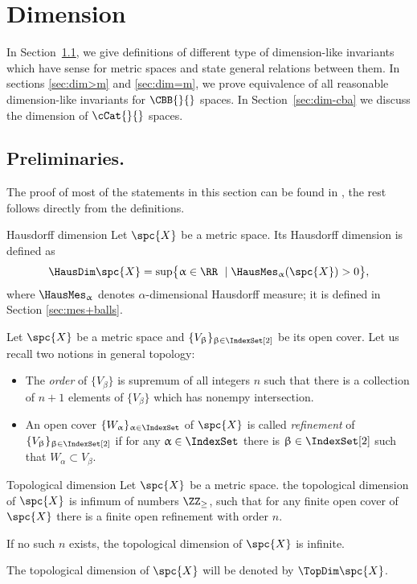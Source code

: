 \chapter{Dimension %
}

In Section~\ref{sec:prelim:dim}, we give definitions of different type of dimension-like invariants which have sense for metric spaces and state general relations between them.
In sections \ref{sec:dim>m} and \ref{sec:dim=m},
we prove equivalence of all reasonable dimension-like invariants for $\CBB{}{}$ spaces.
In Section~\ref{sec:dim-cba} we discuss the dimension of  $\cCat{}{}$ spaces.

\section{Preliminaries.}\label{sec:prelim:dim}

The proof of most of the statements in this section can be found in \cite{top-dim}, 
the rest follows directly from the definitions.

\begin{thm}{Hausdorff dimension}
\label{def:HausDim}
Let $\spc{X}$ be a metric space. 
Its Hausdorff dimension is defined as
\[\HausDim\spc{X}=\sup\bigl\{\alpha\in\RR\ \mid \HausMes_\alpha(\spc{X})>0\bigr\},\]
 where $\HausMes_\alpha$ denotes $\alpha$-dimensional Hausdorff measure;
it is defined in Section \ref{sec:mes+balls}.
\end{thm}

Let $\spc{X}$ be a metric space and $\{V_\beta\}_{\beta\in\IndexSet[2]}$
 be its open cover.
Let us recall two notions in general topology:
\begin{itemize}
\item The \emph{order} of $\{V_\beta\}$ is supremum of all integers $n$ such that there is a collection of $n+1$ elements of $\{V_\beta\}$ which has nonempy intersection.
\item An open cover $\{W_\alpha\}_{\alpha\in\IndexSet}$ of $\spc{X}$ is called \emph{refinement} of  $\{V_\beta\}_{\beta\in\IndexSet[2]}$ if for any $\alpha\in\IndexSet$ there is $\beta\in\IndexSet[2]$ such that $W_\alpha\subset V_\beta$.
\end{itemize}

\begin{thm}{Topological dimension}
\label{def:TopDim}
Let $\spc{X}$ be a metric space. 
the topological dimension of $\spc{X}$ is infimum of numbers $\ZZ_{\ge}$, 
such that for any finite open cover of $\spc{X}$ there is a finite open refinement with order $n$.

If no such $n$ exists, the topological dimension of $\spc{X}$ is infinite.

The topological dimension of $\spc{X}$ will be denoted by $\TopDim\spc{X}$.
\end{thm}

